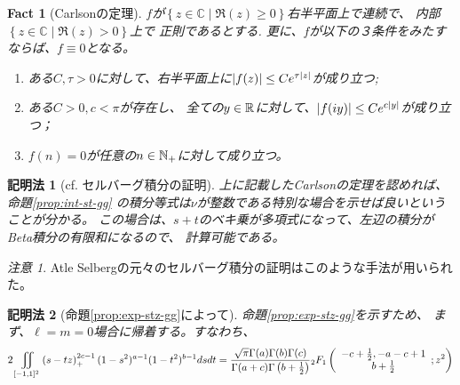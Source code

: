 \documentclass[12pt,a4paper,dvipdfmx]{jsarticle}
\numberwithin{equation}{section}
\theoremstyle{jplain}
\newtheorem{method}{記明法}
\newtheorem{fact}[thm]{Fact}
\theoremstyle{remark}
\newtheorem*{remark*}{注意}
\theoremstyle{definition}
\begin{document}
{\begin{fact}[Carlsonの定理]
	$f$が$\left\{ z\in\mathbb{C}\mid \Re(z)\ge0 \right\}$右半平面上で連続で、
	内部$\left\{ z\in\mathbb{C}\mid\Re(z)>0 \right\}$上で
	正則であるとする.
	更に、$f$が以下の３条件をみたすならば、$f\equiv0$となる。
	\begin{enumerate}
		\item ある$C,\tau>0$に対して、右半平面上に$\left|f(z)\right|\le C e^{\tau\left|z\right|}$が成り立つ;
		\item ある$ C>0,c<\pi$が存在し、
			全ての$y\in\mathbb{R}$に対して、$\left|f(iy)\right|\le Ce^{c\left|y\right|}$が成り立つ；
		\item $f(n)=0$が任意の$n\in\mathbb{N}_+$に対して成り立つ。
	\end{enumerate}
\end{fact}
\begin{method}[cf. セルバーグ積分の証明]
	上に記載したCarlsonの定理を認めれば、
	命題\ref{prop:int-st-gg}
	の積分等式は$\nu$が整数である特別な場合を示せば良いということが分かる。
この場合は、$s+t$のベキ乗が多項式になって、左辺の積分がBeta積分の有限和になるので、
計算可能である。
\end{method}
\begin{remark*}
	Atle Selbergの元々のセルバーグ積分の証明\cite{Selberg:411367}はこのような手法が用いられ{た}。
\end{remark*}
\begin{method}[命題\ref{prop:exp-stz-gg}によって]
	命題\ref{prop:exp-stz-gg}を示すため、
	まず、$\ell=m=0$場合に帰着する。すなわち、
	\begin{multline}
				2\iint\displaylimits_{[-1,1]^2} \left( s-tz \right)_+^{2c-1}  (1 - s^2)^{a - 1} (1 -
				t^2)^{b - 1} d s d t
				=
				\frac{\sqrt{\pi} \Gamma (a) \Gamma (b) \Gamma
			(c)}{\Gamma (a + c) \Gamma \left( b + \frac{1}{2} \right)} {}_2 F_1 \left(
			\begin{array}{c}
				  - c + \frac{1}{2}, - a - c + 1\\
				    b + \frac{1}{2}
			    \end{array} ; z^2 \right)
				\label{eqn:prop21}
	\end{multline}

\end{method}}
\end{document}
